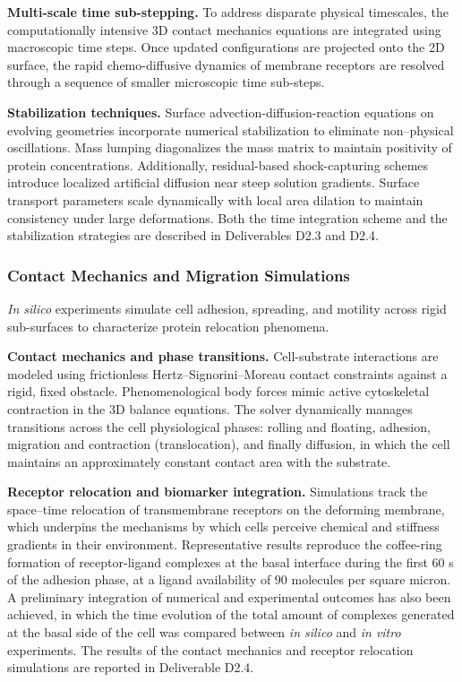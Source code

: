 \documentclass[a4paper,12pt, numbers]{article}
\begin{document}
\noindent\textbf{Multi-scale time sub-stepping.}
To address disparate physical timescales, the computationally intensive 3D contact mechanics equations are integrated using macroscopic time steps. Once updated configurations are projected onto the 2D surface, the rapid chemo-diffusive dynamics of membrane receptors are resolved through a sequence of smaller microscopic time sub-steps.

\noindent\textbf{Stabilization techniques.}
Surface advection-diffusion-reaction equations on evolving geometries incorporate numerical stabilization to eliminate non--physical oscillations. Mass lumping diagonalizes the mass matrix to maintain positivity of protein concentrations. Additionally, residual-based shock-capturing schemes introduce localized artificial diffusion near steep solution gradients. Surface transport parameters scale dynamically with local area dilation to maintain consistency under large deformations. Both the time integration scheme and the stabilization strategies are described in Deliverables D2.3 and D2.4.



\subsubsection*{Contact Mechanics and Migration Simulations}

\noindent \textit{In silico} experiments simulate cell adhesion, spreading, and motility across rigid sub-surfaces to characterize protein relocation phenomena.

\noindent\textbf{Contact mechanics and phase transitions.}
Cell-substrate interactions are modeled using frictionless Hertz--Signorini--Moreau contact constraints against a rigid, fixed obstacle. Phenomenological body forces mimic active cytoskeletal contraction in the 3D balance equations. The solver dynamically manages transitions across the cell physiological phases: rolling and floating, adhesion, migration and contraction (translocation), and finally diffusion, in which the cell maintains an approximately constant contact area with the substrate.

\noindent\textbf{Receptor relocation and biomarker integration.}
Simulations track the space--time relocation of transmembrane receptors on the deforming membrane, which underpins the mechanisms by which cells perceive chemical and stiffness gradients in their environment. Representative results reproduce the coffee-ring formation of receptor-ligand complexes at the basal interface during the first $60$ s of the adhesion phase, at a ligand availability of $90$ molecules per square micron. A preliminary integration of numerical and experimental outcomes has also been achieved, in which the time evolution of the total amount of complexes generated at the basal side of the cell was compared between \emph{in silico} and \emph{in vitro} experiments. The results of the contact mechanics and receptor relocation simulations are reported in Deliverable D2.4.
\end{document}
